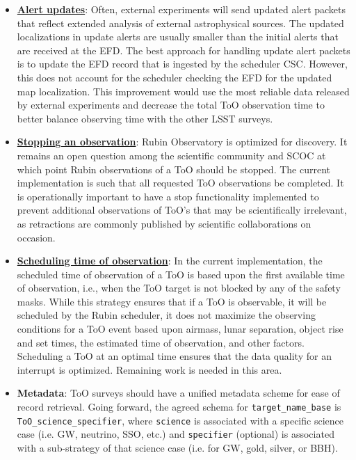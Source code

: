 \begin{itemize}
    \item \textbf{\underline{Alert updates}}: Often, external experiments will send updated alert packets that reflect extended analysis of external astrophysical sources. The updated localizations in update alerts are usually smaller than the initial alerts that are received at the EFD. The best approach for handling update alert packets is to update the EFD record that is ingested by the scheduler CSC. However, this does not account for the scheduler checking the EFD for the updated map localization. This improvement would use the most reliable data released by external experiments and decrease the total ToO observation time to better balance observing time with the other LSST surveys.
    \item \textbf{\underline{Stopping an observation}}: Rubin Observatory is optimized for discovery. It remains an open question among the scientific community and SCOC at which point Rubin observations of a ToO should be stopped. The current implementation is such that all requested ToO observations be completed. It is operationally important to have a stop functionality implemented to prevent additional observations of ToO's that may be scientifically irrelevant, as retractions are commonly published by scientific collaborations on occasion.
    \item \textbf{\underline{Scheduling time of observation}}: In the current implementation, the scheduled time of observation of a ToO is based upon the first available time of observation, i.e., when the ToO target is not blocked by any of the safety masks. While this strategy ensures that if a ToO is observable, it will be scheduled by the Rubin scheduler, it does not maximize the observing conditions for a ToO event based upon airmass, lunar separation, object rise and set times, the estimated time of observation, and other factors. Scheduling a ToO at an optimal time ensures that the data quality for an interrupt is optimized. Remaining work is needed in this area.
    \item \textbf{Metadata}: ToO surveys should have a unified metadata scheme for ease of record retrieval. Going forward, the agreed schema for \texttt{target\_name\_base} is \texttt{ToO\_science\_specifier}, where \texttt{science} is associated with a specific science case (i.e. GW, neutrino, SSO, etc.) and \texttt{specifier} (optional) is associated with a sub-strategy of that science case (i.e. for GW, gold, silver, or BBH).

\end{itemize}
